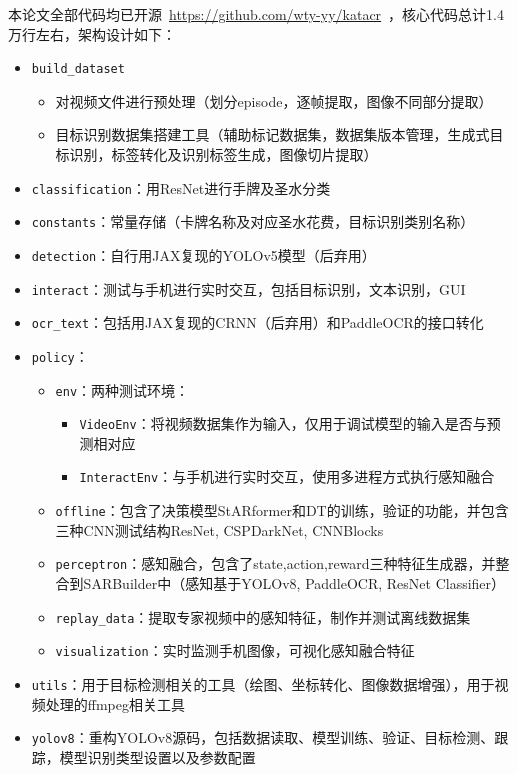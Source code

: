 

本论文全部代码均已开源~\url{https://github.com/wty-yy/katacr}~，核心代码总计1.4万行左右，架构设计如下：

\begin{itemize}
  \item \texttt{build\_dataset}
  \begin{itemize}
    \item 对视频文件进行预处理（划分episode，逐帧提取，图像不同部分提取）
    \item 目标识别数据集搭建工具（辅助标记数据集，数据集版本管理，生成式目标识别，标签转化及识别标签生成，图像切片提取）
  \end{itemize}
  \item \texttt{classification}：用ResNet进行手牌及圣水分类
  \item \texttt{constants}：常量存储（卡牌名称及对应圣水花费，目标识别类别名称）
  \item \texttt{detection}：自行用JAX复现的YOLOv5模型（后弃用）
  \item \texttt{interact}：测试与手机进行实时交互，包括目标识别，文本识别，GUI
  \item \texttt{ocr\_text}：包括用JAX复现的CRNN（后弃用）和PaddleOCR的接口转化
  \item \texttt{policy}：
  \begin{itemize}
    \item \texttt{env}：两种测试环境：
    \begin{itemize}
      \item \texttt{VideoEnv}：将视频数据集作为输入，仅用于调试模型的输入是否与预测相对应
      \item \texttt{InteractEnv}：与手机进行实时交互，使用多进程方式执行感知融合
    \end{itemize}
    \item \texttt{offline}：包含了决策模型StARformer和DT的训练，验证的功能，并包含三种CNN测试结构ResNet, CSPDarkNet, CNNBlocks
    \item \texttt{perceptron}：感知融合，包含了state,action,reward三种特征生成器，并整合到SARBuilder中（感知基于YOLOv8, PaddleOCR, ResNet Classifier）
    \item \texttt{replay\_data}：提取专家视频中的感知特征，制作并测试离线数据集
    \item \texttt{visualization}：实时监测手机图像，可视化感知融合特征
  \end{itemize}
  \item \texttt{utils}：用于目标检测相关的工具（绘图、坐标转化、图像数据增强），用于视频处理的ffmpeg相关工具
  \item \texttt{yolov8}：重构YOLOv8源码，包括数据读取、模型训练、验证、目标检测、跟踪，模型识别类型设置以及参数配置
\end{itemize}
